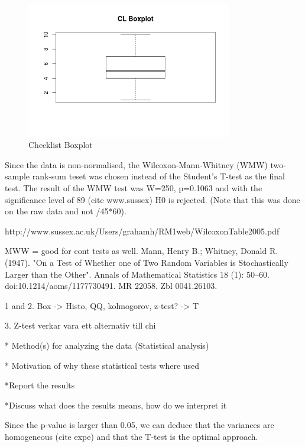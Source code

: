 \documentclass[10pt,twocolumn]{article}
\begin{document}
\begin{figure}[Ht!]
\centering
\includegraphics[width=90mm]{cl_box.png}
\caption{Checklist Boxplot}
\end{figure}

Since the data is non-normalised, the Wilcoxon-Mann-Whitney (WMW) two-sample rank-sum teset was chosen instead of the Student's T-test as the final test. The result of the WMW test was W=250, p=0.1063 and with the significance level of 89 (cite www.sussex) H0 is rejected. (Note that this was done on the raw data and not /45*60).


http://www.sussex.ac.uk/Users/grahamh/RM1web/WilcoxonTable2005.pdf



MWW = good for cont tests as well.
 Mann, Henry B.; Whitney, Donald R. (1947). "On a Test of Whether one of Two Random Variables is Stochastically Larger than the Other". Annals of Mathematical Statistics 18 (1): 50–60. doi:10.1214/aoms/1177730491. MR 22058. Zbl 0041.26103.

1 and 2.
Box
->
Histo, QQ, kolmogorov, z-test?
->
T

3.
Z-test verkar vara ett alternativ till chi

* Method(s) for analyzing the data (Statistical analysis)

* Motivation of why these statistical tests where used


*Report the results

*Discuss what does the results means, how do we interpret it




Since the p-value is larger than 0.05, we can deduce that the variances are homogeneous (cite expe) and that the T-test is the optimal approach.


\end{document}
